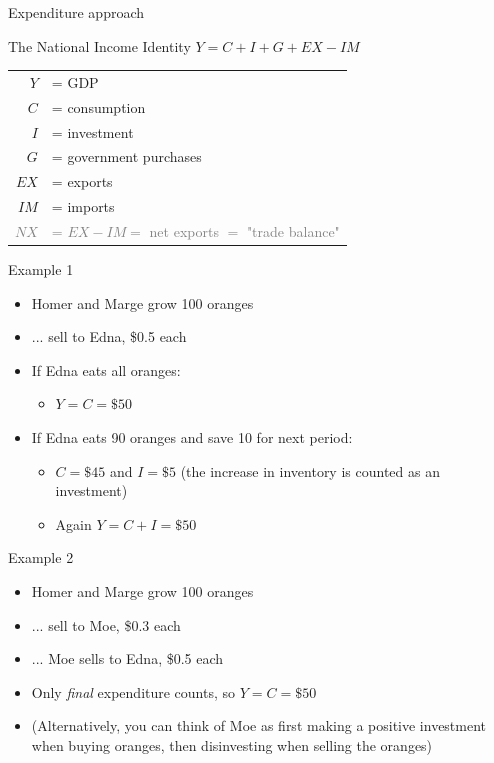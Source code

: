 \documentclass[10pt]{beamer}
\begin{document}
\begin{frame}{Expenditure approach}
\begin{block}{The National Income Identity}
    $Y = C + I + G + EX - IM$
\end{block}
\bigskip

\begin{table}
    \flushleft
    \begin{tabular}{rl}
         $Y$ & = GDP \\
         $C$ & = consumption \\
         $I$ & = investment \\
         $G$ & = government purchases \\
         $EX$ & = exports \\
         $IM$ & = imports \\
         \textcolor{gray}{$NX$} & \textcolor{gray}{= $EX - IM = $ net exports $=$ "trade balance"} \\
    \end{tabular}
\end{table} \medskip
\end{frame}


\begin{frame}{Example 1}
\begin{itemize}
    \item Homer and Marge grow 100 oranges \medskip
    \item ... sell to Edna, \$0.5 each \medskip
    \item If Edna eats all oranges:
    \begin{itemize}
        \item[]$Y = C = \$50$
    \end{itemize} \medskip
    \item If Edna eats 90 oranges and save 10 for next period:
    \begin{itemize}
        \item $C = \$45$ and $I = \$5$ (the increase in inventory is counted as an investment)
        \item Again $Y = C + I = \$50$
    \end{itemize} 
\end{itemize}
\end{frame}


\begin{frame}{Example 2}
\begin{itemize}
    \item Homer and Marge grow 100 oranges
    \item ... sell to Moe, \$0.3 each
    \item ... Moe sells to Edna, \$0.5 each
    \item Only \emph{final} expenditure counts, so $Y = C = \$50$
    \item (Alternatively, you can think of Moe as first making a positive investment when buying oranges, then disinvesting when selling the oranges)
\end{itemize}
\end{frame}
\end{document}
